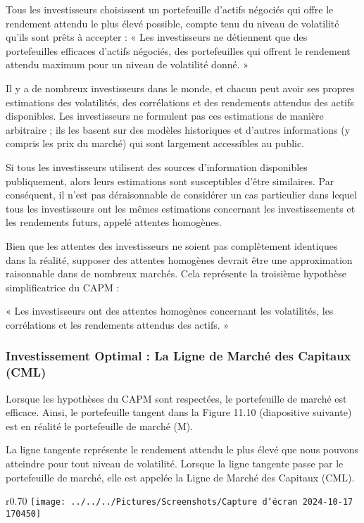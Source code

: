 \documentclass[a4paper, 12pt]{report}
\begin{document}
Tous les investisseurs choisissent un portefeuille d'actifs négociés qui offre le rendement attendu le plus élevé possible, compte tenu du niveau de volatilité qu'ils sont prêts à accepter : « Les investisseurs ne détiennent que des portefeuilles efficaces d'actifs négociés, des portefeuilles qui offrent le rendement attendu maximum pour un niveau de volatilité donné. »

Il y a de nombreux investisseurs dans le monde, et chacun peut avoir ses propres estimations des volatilités, des corrélations et des rendements attendus des actifs disponibles. Les investisseurs ne formulent pas ces estimations de manière arbitraire ; ils les basent sur des modèles historiques et d'autres informations (y compris les prix du marché) qui sont largement accessibles au public.

Si tous les investisseurs utilisent des sources d'information disponibles publiquement, alors leurs estimations sont susceptibles d'être similaires. Par conséquent, il n'est pas déraisonnable de considérer un cas particulier dans lequel tous les investisseurs ont les mêmes estimations concernant les investissements et les rendements futurs, appelé attentes homogènes.

Bien que les attentes des investisseurs ne soient pas complètement identiques dans la réalité, supposer des attentes homogènes devrait être une approximation raisonnable dans de nombreux marchés. Cela représente la troisième hypothèse simplificatrice du CAPM :

« Les investisseurs ont des attentes homogènes concernant les volatilités, les corrélations et les rendements attendus des actifs. »

\subsubsection{Investissement Optimal : La Ligne de Marché des Capitaux (CML)}

Lorsque les hypothèses du CAPM sont respectées, le portefeuille de marché est efficace. Ainsi, le portefeuille tangent dans la Figure 11.10 (diapositive suivante) est en réalité le portefeuille de marché (M).

La ligne tangente représente le rendement attendu le plus élevé que nous pouvons atteindre pour tout niveau de volatilité. Lorsque la ligne tangente passe par le portefeuille de marché, elle est appelée la Ligne de Marché des Capitaux (CML).

\begin{wrapfigure}{r}{0.70\textwidth}
	\centering
	\texttt{[image: ../../../Pictures/Screenshots/Capture d'écran 2024-10-17 170450]}
\end{wrapfigure}
\end{document}
